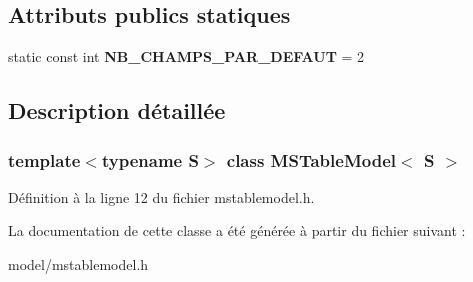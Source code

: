 \subsection*{Attributs publics statiques}
\begin{DoxyCompactItemize}
\item 
\hypertarget{class_m_s_table_model_ac3e1edb66b11ddd8a43516624d770dc6}{
static const int {\bfseries NB\_\-CHAMPS\_\-PAR\_\-DEFAUT} = 2}
\label{d4/dfd/class_m_s_table_model_ac3e1edb66b11ddd8a43516624d770dc6}

\end{DoxyCompactItemize}


\subsection{Description détaillée}
\subsubsection*{template$<$typename S$>$ class MSTableModel$<$ S $>$}



Définition à la ligne 12 du fichier mstablemodel.h.



La documentation de cette classe a été générée à partir du fichier suivant :\begin{DoxyCompactItemize}
\item 
model/mstablemodel.h\end{DoxyCompactItemize}
